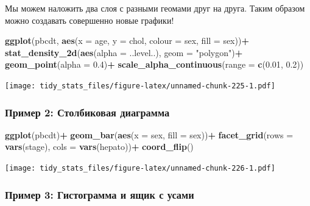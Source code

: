 \documentclass[]{book}
\newenvironment{Shaded}{\begin{snugshade}}{\end{snugshade}}
\newcommand{\KeywordTok}[1]{\textcolor[rgb]{0.13,0.29,0.53}{\textbf{#1}}}
\newcommand{\DataTypeTok}[1]{\textcolor[rgb]{0.13,0.29,0.53}{#1}}
\newcommand{\FloatTok}[1]{\textcolor[rgb]{0.00,0.00,0.81}{#1}}
\newcommand{\StringTok}[1]{\textcolor[rgb]{0.31,0.60,0.02}{#1}}
\newcommand{\OperatorTok}[1]{\textcolor[rgb]{0.81,0.36,0.00}{\textbf{#1}}}
\newcommand{\NormalTok}[1]{#1}
\begin{document}
Мы можем наложить два слоя с разными геомами друг на друга. Таким
образом можно создавать совершенно новые графики!

\begin{Shaded}
\begin{Highlighting}[]
\KeywordTok{ggplot}\NormalTok{(pbcdt, }\KeywordTok{aes}\NormalTok{(}\DataTypeTok{x =}\NormalTok{ age, }\DataTypeTok{y =}\NormalTok{ chol, }\DataTypeTok{colour =}\NormalTok{ sex, }\DataTypeTok{fill =}\NormalTok{ sex))}\OperatorTok{+}
\StringTok{   }\KeywordTok{stat_density_2d}\NormalTok{(}\KeywordTok{aes}\NormalTok{(}\DataTypeTok{alpha =}\NormalTok{ ..level..), }\DataTypeTok{geom =} \StringTok{"polygon"}\NormalTok{)}\OperatorTok{+}
\StringTok{   }\KeywordTok{geom_point}\NormalTok{(}\DataTypeTok{alpha =} \FloatTok{0.4}\NormalTok{)}\OperatorTok{+}
\StringTok{   }\KeywordTok{scale_alpha_continuous}\NormalTok{(}\DataTypeTok{range =} \KeywordTok{c}\NormalTok{(}\FloatTok{0.01}\NormalTok{, }\FloatTok{0.2}\NormalTok{))}
\end{Highlighting}
\end{Shaded}

\texttt{[image: tidy\_stats\_files/figure-latex/unnamed-chunk-225-1.pdf]}

\subsubsection{Пример 2: Столбиковая
диаграмма}\label{ux43fux440ux438ux43cux435ux440-2-ux441ux442ux43eux43bux431ux438ux43aux43eux432ux430ux44f-ux434ux438ux430ux433ux440ux430ux43cux43cux430}

\begin{Shaded}
\begin{Highlighting}[]
\KeywordTok{ggplot}\NormalTok{(pbcdt)}\OperatorTok{+}
\StringTok{  }\KeywordTok{geom_bar}\NormalTok{(}\KeywordTok{aes}\NormalTok{(}\DataTypeTok{x =}\NormalTok{ sex, }\DataTypeTok{fill =}\NormalTok{ sex))}\OperatorTok{+}
\StringTok{  }\KeywordTok{facet_grid}\NormalTok{(}\DataTypeTok{rows =} \KeywordTok{vars}\NormalTok{(stage), }\DataTypeTok{cols =} \KeywordTok{vars}\NormalTok{(hepato))}\OperatorTok{+}
\StringTok{  }\KeywordTok{coord_flip}\NormalTok{()}
\end{Highlighting}
\end{Shaded}

\texttt{[image: tidy\_stats\_files/figure-latex/unnamed-chunk-226-1.pdf]}

\subsubsection{Пример 3: Гистограмма и ящик с
усами}\label{ux43fux440ux438ux43cux435ux440-3-ux433ux438ux441ux442ux43eux433ux440ux430ux43cux43cux430-ux438-ux44fux449ux438ux43a-ux441-ux443ux441ux430ux43cux438}
\end{document}
